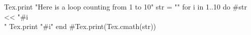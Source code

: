 \documentclass{article}
\begin{document}
\begin{rbtex}
Tex.print "Here is a loop counting from 1 to 10"
str = ""
for i in 1..10 do
    #str << "#{i}\\ "
    Tex.print "#{i}"
end
#Tex.print(Tex.cmath(str))
\end{rbtex}
\end{document}
